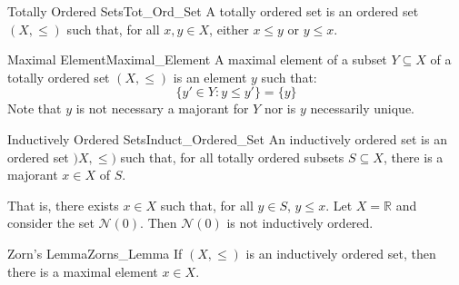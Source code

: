     \begin{ldefinition}{Totally Ordered Sets}{Tot_Ord_Set}
        A totally ordered set is an ordered set $(X,\leq)$ such that, for all
        $x,y\in{X}$, either $x\leq{y}$ or $y\leq{x}$.
    \end{ldefinition}
    \begin{ldefinition}{Maximal Element}{Maximal_Element}
        A maximal element of a subset $Y\subseteq{X}$ of a totally ordered set
        $(X,\leq)$ is an element $y$ such that:
        \begin{equation}
            \{y'\in{Y}:y\leq{y}'\}=\{y\}
        \end{equation}
        Note that $y$ is not necessary a majorant for $Y$ nor is $y$ necessarily
        unique.
    \end{ldefinition}
    \begin{ldefinition}{Inductively Ordered Sets}{Induct_Ordered_Set}
        An inductively ordered set is an ordered set $)X,\leq)$ such that, for
        all totally ordered subsets $S\subseteq{X}$, there is a majorant
        $x\in{X}$ of $S$.
    \end{ldefinition}
    That is, there exists $x\in{X}$ such that, for all $y\in{S}$, $y\leq{x}$.
    Let $X=\mathbb{R}$ and consider the set $\mathscr{N}(0)$. Then
    $\mathscr{N}(0)$ is not inductively ordered.
    \begin{ltheorem}{Zorn's Lemma}{Zorns_Lemma}
        If $(X,\leq)$ is an inductively ordered set, then there is a maximal
        element $x\in{X}$.
    \end{ltheorem}